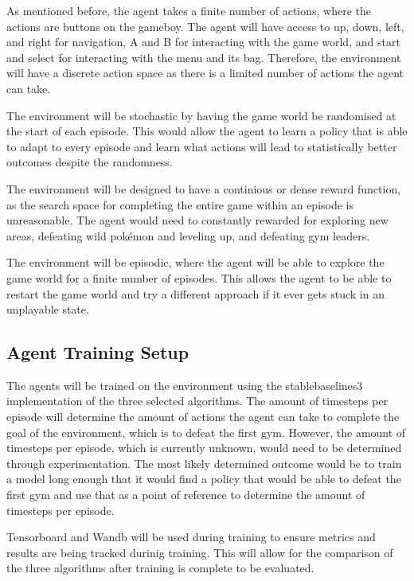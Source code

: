 As mentioned before, the agent takes a finite number of actions, where the actions are buttons on the gameboy. The agent will have access to up, down, left, and right for navigation, A and B for interacting with the game world, and start and select for interacting with the menu and its bag. Therefore, the environment will have a discrete action space as there is a limited number of actions the agent can take. 

The environment will be stochastic by having the game world be randomised at the start of each episode. This would allow the agent to learn a policy that is able to adapt to every episode and learn what actions will lead to statistically better outcomes despite the randomness.

The environment will be designed to have a continious or dense reward function, as the search space for completing the entire game within an episode is unreasonable. The agent would need to constantly rewarded for exploring new areas, defeating wild pokémon and leveling up, and defeating gym leaders. 

The environment will be episodic, where the agent will be able to explore the game world for a finite number of episodes. This allows the agent to be able to restart the game world and try a different approach if it ever gets stuck in an unplayable state.

\subsection{Agent Training Setup}

The agents will be trained on the environment using the stablebaselines3 implementation of the three selected algorithms. The amount of timesteps per episode will determine the amount of actions the agent can take to complete the goal of the environment, which is to defeat the first gym. However, the amount of timesteps per episode, which is currently unknown, would need to be determined through experimentation. The most likely determined outcome would be to train a model long enough that it would find a policy that would be able to defeat the first gym and use that as a point of reference to determine the amount of timesteps per episode. 

Tensorboard and Wandb will be used during training to ensure metrics and results are being tracked durinig training. This will allow for the comparison of the three algorithms after training is complete to be evaluated. 

